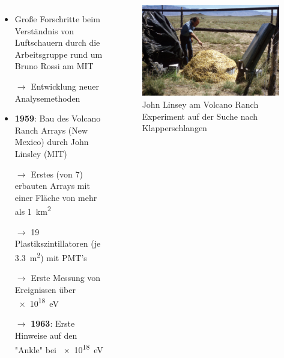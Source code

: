 \documentclass[aspectratio=1610, professionalfonts, 9pt, hyperref={colorlinks=false}]{beamer}
\begin{document}
\begin{frame}{}
  \begin{columns}
      \begin{itemize}
        \setlength\itemsep{0.5em}
        \item Große Forschritte beim Verständnis von Luftschauern durch die Arbeitsgruppe rund um Bruno Rossi am MIT
        \item[$\rightarrow$] Entwicklung neuer Analysemethoden
        \item \textbf{1959}: Bau des Volcano Ranch Arrays (New Mexico) durch John Linsley (MIT)
        \item[$\rightarrow$] Erstes (von 7) erbauten Arrays mit einer Fläche von mehr als \SI{1}{\kilo\metre\squared}
        \item[$\rightarrow$] 19 Plastikszintillatoren (je \SI{3.3}{\metre\squared}) mit PMT's
        \item[$\rightarrow$] Erste Messung von Ereignissen über \SI{e18}{\electronvolt}
        \item[$\rightarrow$] \textbf{1963}: Erste Hinweise auf den "Ankle" bei \SI{e18}{\electronvolt}
      \end{itemize}
        \vspace*{10px}
  
      \begin{figure}
          \centering
          \includegraphics[width=\linewidth]{images/linsey.jpg}
          \caption{John Linsey am Volcano Ranch Experiment auf der Suche nach Klapperschlangen \cite{linsey}}
      \end{figure}
  \end{columns}
\end{frame}
\end{document}
